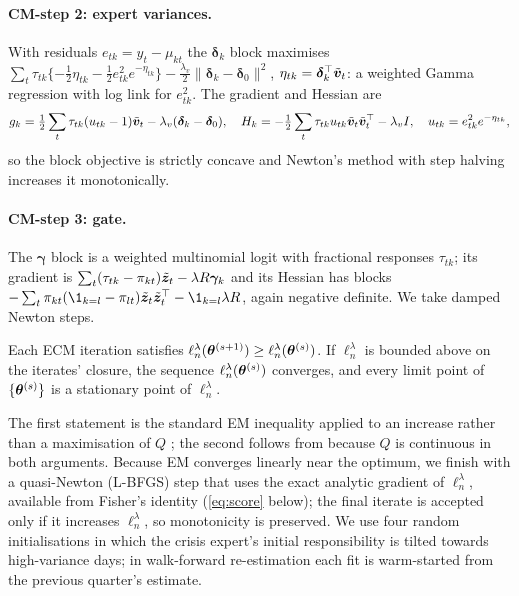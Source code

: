\paragraph{CM-step 2: expert variances.} With residuals $e_{tk}=y_t-\mu_{kt}$ the $\bm\delta_k$
block maximises
$\sum_t\tau_{tk}\{-\tfrac12\eta_{tk}-\tfrac12e_{tk}^2e^{-\eta_{tk}}\}-\tfrac{\lambda_v}{2}\|\bm\delta_k-\bm\delta_0\|^2$,
$\eta_{tk}=\bm\delta_k^\top\tilde{\bm{v}}_t$: a weighted Gamma regression with log link for $e^2_{tk}$.
The gradient and Hessian are
\begin{equation}
  g_k=\tfrac12\sum_t\tau_{tk}(u_{tk}-1)\tilde{\bm{v}}_t-\lambda_v(\bm\delta_k-\bm\delta_0),\quad
  H_k=-\tfrac12\sum_t\tau_{tk}u_{tk}\tilde{\bm{v}}_t\tilde{\bm{v}}_t^\top-\lambda_vI,\quad u_{tk}=e^2_{tk}e^{-\eta_{tk}},
\end{equation}
so the block objective is strictly concave and Newton's method with step halving increases it
monotonically.

\paragraph{CM-step 3: gate.} The $\bm\gamma$ block is a weighted multinomial logit with fractional
responses $\tau_{tk}$; its gradient is $\sum_t(\tau_{tk}-\pi_{kt})\tilde{\bm{z}}_t-\lambda R\bm\gamma_k$ and
its Hessian has blocks $-\sum_t\pi_{kt}(\1_{k=l}-\pi_{lt})\tilde\bz_t\tilde\bz_t^\top-\1_{k=l}\lambda R$,
again negative definite. We take damped Newton steps.

\begin{proposition}[Monotonicity]\label{prop:monotone}
Each ECM iteration satisfies $\ell^\lambda_n(\bm{\theta}^{(s+1)})\ge\ell^\lambda_n(\bm{\theta}^{(s)})$. If
$\ell^\lambda_n$ is bounded above on the iterates' closure, the sequence
$\ell^\lambda_n(\bm{\theta}^{(s)})$ converges, and every limit point of $\{\bm{\theta}^{(s)}\}$ is a
stationary point of $\ell_n^\lambda$.
\end{proposition}

\noindent The first statement is the standard EM inequality applied to an increase rather than a
maximisation of $Q$ \citep{dempster1977maximum,meng1993maximum}; the second follows from
\citet{wu1983convergence} because $Q$ is continuous in both arguments. Because EM converges linearly
near the optimum, we finish with a quasi-Newton (L-BFGS) step that uses the exact analytic gradient
of $\ell^\lambda_n$, available from Fisher's identity (\cref{eq:score} below); the final iterate is
accepted only if it increases $\ell^\lambda_n$, so monotonicity is preserved. We use four random
initialisations in which the crisis expert's initial responsibility is tilted towards high-variance
days; in walk-forward re-estimation each fit is warm-started from the previous quarter's estimate.

